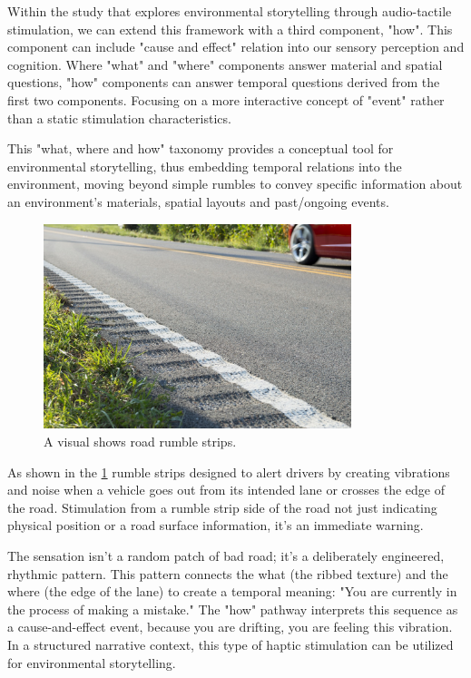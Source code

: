             Within the study that explores environmental storytelling through audio-tactile stimulation, we can extend this framework with a third component, "how". This component can include "cause and effect" relation into our sensory perception and cognition. Where "what" and "where" components answer material and spatial questions, "how" components can answer temporal questions derived from the first two components. Focusing on a more interactive concept of "event" rather than a static stimulation characteristics.\par

            This "what, where and how" taxonomy provides a conceptual tool for environmental storytelling, thus embedding temporal relations into the environment, moving beyond simple rumbles to convey specific information about an environment's materials, spatial layouts and past/ongoing events.\par

            \begin{figure}[H]
                \centering
                \includegraphics[width=0.8\textwidth]{images/rumble_strips.jpg}
                \caption{A visual shows road rumble strips.}
                \label{fig:RUMBLE_STRIP}
            \end{figure}

            As shown in the \ref{fig:RUMBLE_STRIP} rumble strips designed to alert drivers by creating vibrations and noise when a vehicle goes out from its intended lane or crosses the edge of the road. Stimulation from a rumble strip side of the road not just indicating physical position or a road surface information, it's an immediate warning.\par

            The sensation isn't a random patch of bad road; it's a deliberately engineered, rhythmic pattern. This pattern connects the what (the ribbed texture) and the where (the edge of the lane) to create a temporal meaning: "You are currently in the process of making a mistake." The "how" pathway interprets this sequence as a cause-and-effect event, because you are drifting, you are feeling this vibration. In a structured narrative context, this type of haptic stimulation can be utilized for environmental storytelling.\par

